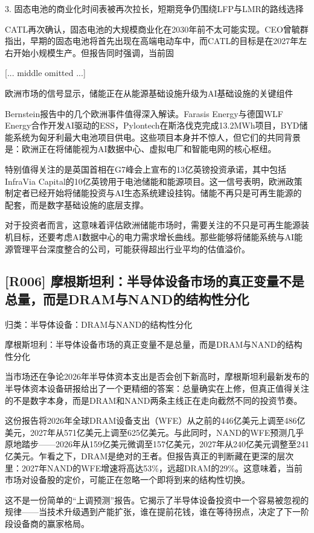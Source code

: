 \documentclass[11pt]{ctexart}
\begin{document}
3. 固态电池的商业化时间表被再次拉长，短期竞争仍围绕LFP与LMR的路线选择

CATL再次确认，固态电池的大规模商业化在2030年前不太可能实现。CEO曾毓群指出，早期的固态电池将首先出现在高端电动车中，而CATL的目标是在2027年左右开始小规模生产。但报告同时强调，当前固

[... middle omitted ...]

欧洲市场的信号显示，储能正在从能源基础设施升级为AI基础设施的关键组件

Bernstein报告中的几个欧洲事件值得深入解读。Farasis Energy与德国WLF Energy合作开发AI驱动的ESS，Pylontech在斯洛伐克完成13.2MWh项目，BYD储能系统为匈牙利最大电池项目供电。这些项目本身并不惊人，但它们的共同背景是：欧洲正在将储能视为AI数据中心、虚拟电厂和智能电网的核心枢纽。

特别值得关注的是英国首相在G7峰会上宣布的13亿英镑投资承诺，其中包括InfraVia Capital的10亿英镑用于电池储能和能源项目。这一信号表明，欧洲政策制定者已经开始将储能投资与AI生态系统建设挂钩。储能不再只是可再生能源的配套，而是数字基础设施的底层支撑。

对于投资者而言，这意味着评估欧洲储能市场时，需要关注的不只是可再生能源装机目标，还要考虑AI数据中心的电力需求增长曲线。那些能够将储能系统与AI能源管理平台深度整合的公司，可能获得超出行业平均的估值溢价。

\subsection{[R006] 摩根斯坦利：半导体设备市场的真正变量不是总量，而是DRAM与NAND的结构性分化}
{\small\color{refgray}归类：半导体设备：DRAM与NAND的结构性分化}

摩根斯坦利：半导体设备市场的真正变量不是总量，而是DRAM与NAND的结构性分化

当市场还在争论2026年半导体资本支出是否会创下新高时，摩根斯坦利最新发布的半导体资本设备研报给出了一个更精细的答案：总量确实在上修，但真正值得关注的不是数字本身，而是DRAM和NAND两条主线正在走向截然不同的投资节奏。

这份报告将2026年全球DRAM设备支出（WFE）从之前的446亿美元上调至486亿美元，2027年从571亿美元上调至625亿美元。与此同时，NAND的WFE预测几乎原地踏步——2026年从159亿美元微调至157亿美元，2027年从240亿美元调整至241亿美元。乍看之下，DRAM是绝对的王者。但报告真正的判断藏在更深的层次里：2027年NAND的WFE增速将高达53\%，远超DRAM的29\%。这意味着，当前市场对设备股的定价，可能正在忽略一个即将到来的结构性切换。

这不是一份简单的“上调预测”报告。它揭示了半导体设备投资中一个容易被忽视的规律——当技术升级遇到产能扩张，谁在提前花钱，谁在等待拐点，决定了下一阶段设备商的赢家格局。
\end{document}
